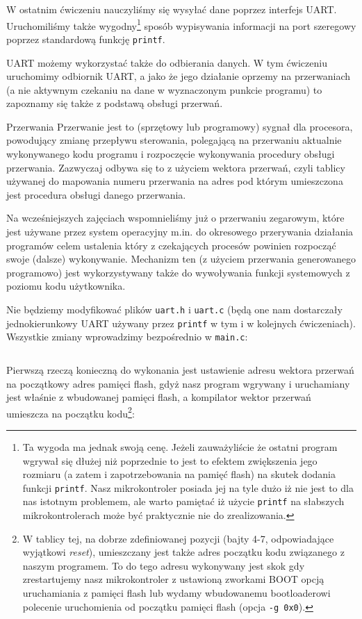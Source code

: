\documentclass{pdfBooklets}
\begin{document}
W ostatnim ćwiczeniu nauczyliśmy się wysyłać dane poprzez interfejs UART. Uruchomiliśmy także wygodny\footnote{
	Ta wygoda ma jednak swoją cenę.
	Jeżeli zauważyliście że ostatni program wgrywał się dłużej niż poprzednie to jest to efektem zwiększenia jego rozmiaru (a zatem i zapotrzebowania na pamięć flash) na skutek dodania funkcji \Verb$printf$.
	Nasz mikrokontroler posiada jej na tyle dużo iż nie jest to dla nas istotnym problemem, ale warto pamiętać iż użycie \Verb$printf$ na słabszych mikrokontrolerach może być praktycznie nie do zrealizowania.
}
sposób wypisywania informacji na port szeregowy poprzez standardową funkcję \Verb$printf$.

UART możemy wykorzystać także do odbierania danych. W tym ćwiczeniu uruchomimy odbiornik UART, a jako że jego działanie oprzemy na przerwaniach (a nie aktywnym czekaniu na dane w wyznaczonym punkcie programu) to zapoznamy się także z podstawą obsługi przerwań.

\begin{ProTip}{Przerwania}
  Przerwanie jest to (sprzętowy lub programowy) sygnał dla procesora, powodujący zmianę przepływu sterowania, polegającą na przerwaniu aktualnie wykonywanego kodu programu i rozpoczęcie wykonywania procedury obsługi przerwania.
  Zazwyczaj odbywa się to z użyciem wektora przerwań, czyli tablicy używanej do mapowania numeru przerwania na adres pod którym umieszczona jest procedura obsługi danego przerwania.
  
  Na wcześniejszych zajęciach wspomnieliśmy już o przerwaniu zegarowym, które jest używane przez system operacyjny m.in. do okresowego przerywania działania programów celem ustalenia który z czekających procesów powinien rozpocząć swoje (dalsze) wykonywanie.
  Mechanizm ten (z użyciem przerwania generowanego programowo) jest wykorzystywany także do wywoływania funkcji systemowych z poziomu kodu użytkownika.
\end{ProTip}

Nie będziemy modyfikować plików \Verb$uart.h$ i \Verb$uart.c$ (będą one nam dostarczały jednokierunkowy UART używany przez \Verb$printf$ w tym i w kolejnych ćwiczeniach). Wszystkie zmiany wprowadzimy bezpośrednio w \Verb$main.c$:

\inputminted[frame=single,firstline=6]{c}{stm32-examples/02b_uart2/main.c}

Pierwszą rzeczą konieczną do wykonania jest ustawienie adresu wektora przerwań na początkowy adres pamięci flash,
	gdyż nasz program wgrywany i uruchamiany jest właśnie z wbudowanej pamięci flash,
	a kompilator wektor przerwań umieszcza na początku kodu\footnote{
		W tablicy tej, na dobrze zdefiniowanej pozycji (bajty 4-7, odpowiadające wyjątkowi \textit{reset}), umieszczany jest także adres początku kodu związanego z naszym programem.
		To do tego adresu wykonywany jest skok gdy zrestartujemy nasz mikrokontroler z ustawioną zworkami BOOT opcją uruchamiania z pamięci flash
			lub wydamy wbudowanemu bootloaderowi polecenie uruchomienia od początku pamięci flash (opcja \Verb$-g 0x0$).
	}:
	
\end{document}
